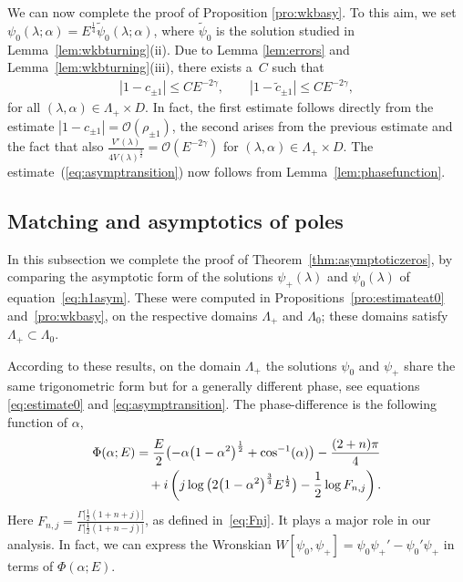 \documentclass[pdftex]{sigma}
\numberwithin{equation}{section}
\newcommand{\la}{\lambda}
\newcommand{\al}{\alpha}
\begin{document}
We can now complete the proof of Proposition \ref{pro:wkbasy}. To this aim, we set $\psi_0(\la;\al)=E^{\frac14}\widetilde{\psi}_0(\la;\al)$, where $\widetilde{\psi}_0$ is the solution studied in Lemma~\ref{lem:wkbturning}(ii). Due to Lemma \ref{lem:errors} and Lemma~\ref{lem:wkbturning}(iii), there exists a~$C$ such that
\begin{gather*}
|1-c_{\pm1}|\leq C E^{-2\gamma}, \qquad |1-\widetilde{c}_{\pm1}|\leq C E^{-2\gamma},
\end{gather*}
for all $(\la,\al) \in \Lambda_+ \times D$. In fact, the f\/irst estimate follows directly from the estimate $|1-c_{\pm1}|=\mathcal{O}(\rho_{\pm1})$, the second arises from the previous estimate and the fact that also $\frac{V'(\la)}{4 V(\la)^{\frac32}} = \mathcal{O}(E^{-2\gamma})$ for $(\la,\al) \in \Lambda_+ \times D$. The estimate~(\ref{eq:asymptransition}) now follows from Lemma~\ref{lem:phasefunction}.

\subsection{Matching and asymptotics of poles}\label{sub:matching}
In this subsection we complete the proof of Theorem~\ref{thm:asymptoticzeros}, by comparing the asymptotic form of the solutions
$\psi_+(\la)$ and $\psi_0(\la)$ of equation~\eqref{eq:h1asym}.
These were computed in Propositions~\ref{pro:estimateat0} and~\ref{pro:wkbasy}, on the respective domains $\Lambda_+$ and $\Lambda_0$; these domains satisfy $\Lambda_+\subset \Lambda_0$.

According to these results, on the domain $\Lambda_{+}$ the solutions $\psi_0$ and $\psi_+$ share the same trigonometric form
but for a generally dif\/ferent phase, see equations \eqref{eq:estimate0} and \eqref{eq:asymptransition}.
The phase-dif\/ference is the following function of $\al$,
\begin{gather}\nonumber
\Phi(\al;E)=\frac{E}{2}\big({-}\al\big(1-\al^2\big)^{\frac12}+\cos^{-1}(\al)\big)-\frac{(2+n)\pi}{4} \\ \label{eq:Phi}
\hphantom{\Phi(\al;E)=}{}+
i\left( j \log\big(2\big(1-\al^2\big)^{\frac34}E^{\frac12}\big) -\frac{1}{2} \log F_{n,j}\right) .
\end{gather}
Here $F_{n,j}=\frac{\Gamma\big[\tfrac{1}{2}(1+n+j)\big]}{\Gamma\big[\tfrac{1}{2}(1+n-j)\big]}$, as def\/ined in~\eqref{eq:Fnj}. It plays a major role in our analysis. In fact, we can express the Wronskian $W[\psi_0,\psi_+]=\psi_0\psi_+'-\psi_0'\psi_+$ in terms of $\Phi(\al;E)$.
\end{document}

